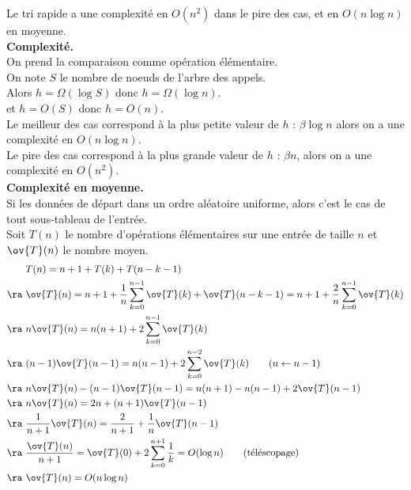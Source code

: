 \documentclass[french, 11pt]{article}
\begin{document}
\begin{prop}{}{}
    Le tri rapide a une complexité en $O(n^2)$ dans le pire des cas, et en $O(n\log n)$ en moyenne.\\
    \textbf{Complexité.}\\
    On prend la comparaison comme opération élémentaire.\\
    On note $S$ le nombre de noeuds de l'arbre des appels.\\
    Alors $h=\Omega(\log S)$ donc $h=\Omega(\log n)$.\\
    et $h=O(S)$ donc $h=O(n)$.\\
    Le meilleur des cas correspond à la plus petite valeur de $h$ : $\beta\log n$ alors on a une complexité en $O(n\log n)$.\\
    Le pire des cas correspond à la plus grande valeur de $h$ : $\beta n$, alors on a une complexité en $O(n^2)$.\\
    \textbf{Complexité en moyenne.}\\
    Si les données de départ dans un ordre aléatoire uniforme, alors c'est le cas de tout sous-tableau de l'entrée.\\
    Soit $T(n)$ le nombre d'opérations élémentaires sur une entrée de taille $n$ et $\ov{T}(n)$ le nombre moyen.
    \begin{align*}
        &T(n) = n + 1 + T(k) + T(n - k - 1)\\
        \ra~&\ov{T}(n) = n+1+\frac{1}{n}\sum_{k=0}^{n-1}{\ov{T}(k)+\ov{T}(n-k-1)}=n+1+\frac{2}{n}\sum_{k=0}^{n-1}\ov{T}(k)\\
        \ra~&n\ov{T}(n) = n(n+1) + 2\sum_{k=0}^{n-1}\ov{T}(k)\\
        \ra~&(n-1)\ov{T}(n-1)=n(n-1) + 2\sum_{k=0}^{n-2}\ov{T}(k) \qquad (n \gets n-1)\\
        \ra~&n\ov{T}(n) - (n-1)\ov{T}(n-1) = n(n+1) - n(n-1)+2\ov{T}(n-1)\\
        \ra~&n\ov{T}(n) = 2n +(n+1)\ov{T}(n-1)\\
        \ra~&\frac{1}{n+1}\ov{T}(n)=\frac{2}{n+1}+\frac{1}{n}\ov{T}(n-1)\\
        \ra~&\frac{\ov{T}(n)}{n+1}=\ov{T}(0) + 2\sum_{k=0}^{n+1}\frac{1}{k} = O(\log n) \qquad \text{(téléscopage)}\\
        \ra~&\ov{T}(n)=O(n\log n)
    \end{align*}
\end{prop}
\end{document}

